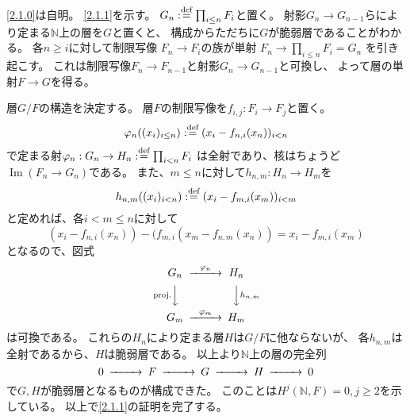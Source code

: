 \documentclass[uplatex,dvipdfmx]{jsarticle}
\makeatletter
\theoremstyle{definition}
\renewenvironment{proof}[1][\proofname]{
  \pushQED{\qed}%
  \normalfont \topsep6\p@\@plus6\p@\relax
  \trivlist
  \item[\hskip\labelsep
    #1\@addpunct{\textbf{.}}]\ignorespaces
}{%
  \popQED\endtrivlist\@endpefalse
}
\providecommand{\proofname}{証明}
\DeclareMathOperator{\im}{\mathrm{Im}}
\newcommand\N{\mathbb{N}}
\def\dfn{:\overset{\mbox{{\scriptsize def}}}{=}}
\makeatother
\begin{document}
\begin{proof}
  \ref{2.1.0}は自明。
  \ref{2.1.1}を示す。
  \(G_n \dfn \prod_{i\leq n}F_i\)と置く。
  射影\(G_n\to G_{n-1}\)らにより定まる\(\N\)上の層を\(G\)と置くと、
  構成からただちに\(G\)が脆弱層であることがわかる。
  各\(n\geq i\)に対して制限写像
  \(F_n \to F_i\)の族が単射
  \(F_n \to \prod_{i\leq n}F_i = G_n\)
  を引き起こす。
  これは制限写像\(F_n\to F_{n-1}\)と射影\(G_n\to G_{n-1}\)と可換し、
  よって層の単射\(F\to G\)を得る。

  層\(G/F\)の構造を決定する。
  層\(F\)の制限写像を\(f_{i,j}:F_i\to F_j\)と置く。
  \[
  \varphi_n ((x_i)_{i\leq n}) \dfn (x_i-f_{n,i}(x_n))_{i<n}
  \]
  で定まる射\(\varphi_n : G_n \to H_n \dfn \prod_{i<n}F_i\)
  は全射であり、核はちょうど\(\im(F_n\to G_n)\)である。
  また、\(m\leq n\)に対して\(h_{n,m}: H_n\to H_m\)を
  \[
  h_{n,m}((x_i)_{i<n}) \dfn (x_i - f_{m,i}(x_m))_{i<m}
  \]
  と定めれば、各\(i < m \leq n\)に対して
  \[
  (x_i - f_{n,i}(x_n)) - (f_{m,i}(x_m - f_{n,m}(x_n))
  = x_i - f_{m,i}(x_m)
  \]
  となるので、図式
  \[
  \begin{CD}
    G_n @> \varphi_n >> H_n \\
    @V \text{proj.} VV @VV h_{n,m} V \\
    G_m @> \varphi_m >> H_m
  \end{CD}
  \]
  は可換である。
  これらの\(H_n\)により定まる層\(H\)は\(G/F\)に他ならないが、
  各\(h_{n,m}\)は全射であるから、\(H\)は脆弱層である。
  以上より\(\N\)上の層の完全列
  \[
  \begin{CD}
    0 @>>> F @>>> G @>>> H @>>> 0
  \end{CD}
  \]
  で\(G,H\)が脆弱層となるものが構成できた。
  このことは\(H^j(\N,F) = 0 , j\geq 2\)を示している。
  以上で\ref{2.1.1}の証明を完了する。


\end{proof}
\end{document}
